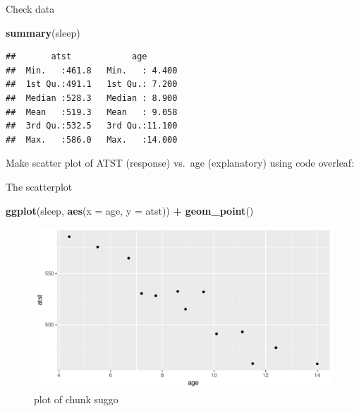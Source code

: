 \documentclass[ignorenonframetext,]{beamer}
\newenvironment{Shaded}{\begin{snugshade}}{\end{snugshade}}
\newcommand{\DataTypeTok}[1]{\textcolor[rgb]{0.13,0.29,0.53}{#1}}
\newcommand{\KeywordTok}[1]{\textcolor[rgb]{0.13,0.29,0.53}{\textbf{#1}}}
\newcommand{\NormalTok}[1]{#1}
\newcommand{\OperatorTok}[1]{\textcolor[rgb]{0.81,0.36,0.00}{\textbf{#1}}}
\newcommand{\StringTok}[1]{\textcolor[rgb]{0.31,0.60,0.02}{#1}}
\begin{document}
\begin{frame}[fragile]{Check data}
\protect\hypertarget{check-data}{}

\begin{Shaded}
\begin{Highlighting}[]
\KeywordTok{summary}\NormalTok{(sleep)}
\end{Highlighting}
\end{Shaded}

\begin{verbatim}
##       atst            age        
##  Min.   :461.8   Min.   : 4.400  
##  1st Qu.:491.1   1st Qu.: 7.200  
##  Median :528.3   Median : 8.900  
##  Mean   :519.3   Mean   : 9.058  
##  3rd Qu.:532.5   3rd Qu.:11.100  
##  Max.   :586.0   Max.   :14.000
\end{verbatim}

Make scatter plot of ATST (response) vs.~age (explanatory) using code
overleaf:

\end{frame}

\begin{frame}[fragile]{The scatterplot}
\protect\hypertarget{the-scatterplot}{}

\begin{Shaded}
\begin{Highlighting}[]
\KeywordTok{ggplot}\NormalTok{(sleep, }\KeywordTok{aes}\NormalTok{(}\DataTypeTok{x =}\NormalTok{ age, }\DataTypeTok{y =}\NormalTok{ atst)) }\OperatorTok{+}\StringTok{ }\KeywordTok{geom_point}\NormalTok{()}
\end{Highlighting}
\end{Shaded}

\begin{figure}
\centering
\includegraphics{figure/suggo-1.pdf}
\caption{plot of chunk suggo}
\end{figure}

\end{frame}
\end{document}
